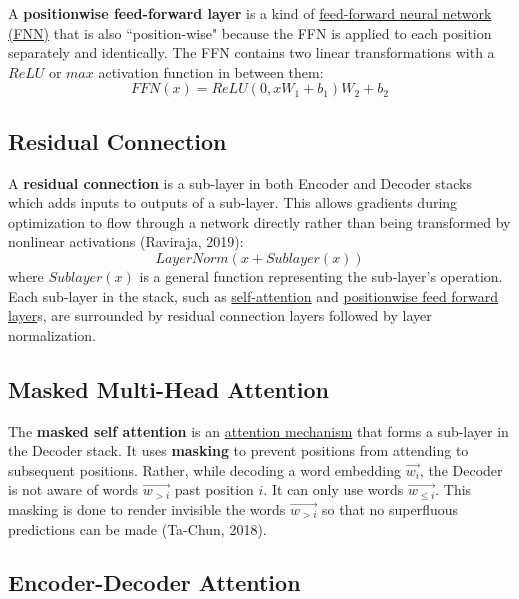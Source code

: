 A \textbf{positionwise feed-forward layer} is a kind of \hyperref[sec:NeuralNetRepr]{feed-forward neural network (FNN)} that is also ``position-wise" because the FFN is applied to each position separately and identically. The FFN contains two linear transformations with a $\textit{ReLU}$ or $\textit{max}$ activation function in between them:
$$
\textit{FFN}(x) = \textit{ReLU}(0, x W_1 + b_1) W_2 + b_2
$$

\subsection{Residual Connection} \label{sec:ResidualConnections}

A \textbf{residual connection} is a sub-layer in both Encoder and Decoder stacks which adds inputs to outputs of a sub-layer. This allows gradients during optimization to flow through a network directly rather than being transformed by nonlinear activations (Raviraja, 2019): 
$$
\textit{LayerNorm}(x + \textit{Sublayer}(x))
$$
where $\textit{Sublayer}(x)$ is a general function representing the sub-layer's operation. Each sub-layer in the stack, such as \hyperref[sec:SelfAttention]{self-attention} and \hyperref[sec:PositionwiseFFNLayers]{positionwise feed forward layer}s, are surrounded by residual connection layers followed by layer normalization. 




\subsection{Masked Multi-Head Attention} \label{sec:MaskedMultiHeadAttention}

The \textbf{masked self attention} is an \hyperref[sec:AttentionMechanism]{attention mechanism} that forms a sub-layer in the Decoder stack. It uses \textbf{masking} to prevent positions from attending to subsequent positions. Rather, while decoding a word embedding $\overrightarrow{w_i}$, the Decoder is not aware of words  $\overrightarrow{w_{>i}}$ past position $i$. It can only use words $\overrightarrow{w_{\leq i}}$. This masking is done to render invisible the words $\overrightarrow{w_{>i}}$ so that no superfluous predictions can be made (Ta-Chun, 2018). 

\subsection{Encoder-Decoder Attention} \label{sec:EncoderDecoderAttention}

